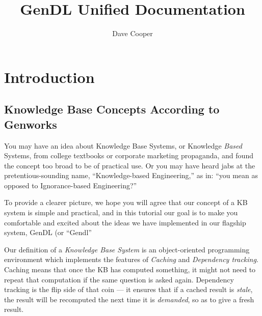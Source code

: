 \documentclass [11pt]{book}
\author {Dave Cooper}
\title {GenDL Unified Documentation}
\begin{document}
\frontmatter



\maketitle



\tableofcontents



\mainmatter



\chapter{Introduction}

\label{chap:introduction}



\section{Knowledge Base Concepts According to Genworks}

\label{sec:knowledgebaseconceptsaccordingtogenworks}

You may have an idea about Knowledge Base Systems,
or Knowledge \emph{Based} Systems, from college textbooks or corporate marketing propaganda, and found the 
concept too broad to be of practical use. Or you may have heard jabs at the 
pretentious-sounding name, ``Knowledge-based Engineering,'' as in: ``you mean as opposed to Ignorance-based Engineering?'' 

To provide a clearer picture, we hope you will agree that our concept
of a KB system is simple and practical, and in this tutorial our goal
is to make you comfortable and excited about the ideas we have
implemented in our flagship system, GenDL (or ``Gendl'' 


Our definition of a \emph{Knowledge Base System} is an object-oriented programming environment which implements the features of \emph{Caching} and \emph{Dependency tracking}. Caching means that once the KB has computed something, it might not need to repeat 
that computation if the same question is asked again. Dependency tracking is the flip side
of that coin --- it ensures that if a cached result is \emph{stale}, the result will be recomputed the next time it is \emph{demanded}, so as to give a fresh result.
\end{document}

